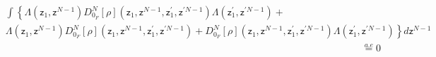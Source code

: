 \documentclass[aps,preprint]{revtex4}%
\begin{document}
\begin{align}
&  \int\left\{  \Lambda\left(  \mathsf{z}_{1},\mathsf{z}^{N-1}\right)
D_{0_{F}}^{N}\left[  \rho\right]  \left(  \mathsf{z}_{1},\mathsf{z}%
^{N-1},\mathsf{z}_{1}^{\prime},\mathsf{z}^{\prime N-1}\right)  \Lambda\left(
\mathsf{z}_{1}^{\prime},\mathsf{z}^{\prime N-1}\right)  +\right. \nonumber\\
&  \left.  \Lambda\left(  \mathsf{z}_{1},\mathsf{z}^{N-1}\right)  D_{0_{F}%
}^{N}\left[  \rho\right]  \left(  \mathsf{z}_{1},\mathsf{z}^{N-1}%
,\mathsf{z}_{1}^{\prime},\mathsf{z}^{\prime N-1}\right)  +D_{0_{F}}^{N}\left[
\rho\right]  \left(  \mathsf{z}_{1},\mathsf{z}^{N-1},\mathsf{z}_{1}^{\prime
},\mathsf{z}^{\prime N-1}\right)  \Lambda\left(  \mathsf{z}_{1}^{\prime
},\mathsf{z}^{\prime N-1}\right)  \right\}  d\mathsf{z}^{N-1}\nonumber\\
&  \qquad\qquad\qquad\qquad\qquad\qquad\qquad\qquad\qquad\qquad\qquad
\qquad\qquad\qquad\qquad\qquad\qquad\qquad\overset{a.e}{=}0
\end{align}
\end{document}
